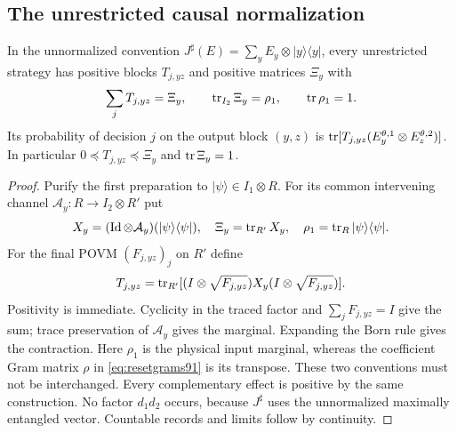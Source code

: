 \subsection{The unrestricted causal normalization}
\begin{proposition}\label{prop:causalnormal91}
In the unnormalized convention
$J^\sharp(E)=\sum_yE_y\otimes|y\rangle\langle y|$, every unrestricted
strategy has positive blocks $T_{j,yz}$ and positive matrices $\Xi_y$ with
\begin{equation}\label{eq:causalnormal91}
 \sum_jT_{j,yz}=\Xi_y,\qquad
 \operatorname{tr}_{I_2}\Xi_y=\rho_1,\qquad\operatorname{tr}\rho_1=1.
\end{equation}
Its probability of decision $j$ on the output block $(y,z)$ is
$\operatorname{tr}[T_{j,yz}(E_y^{\theta,1}\otimes E_z^{\theta,2})]$.
In particular $0\preceq T_{j,yz}\preceq\Xi_y$ and $\operatorname{tr}\Xi_y=1$.
\end{proposition}
\begin{proof}
Purify the first preparation to $|\psi\rangle\in I_1\otimes R$.
For its common intervening channel $\mathcal A_y:R\to I_2\otimes R'$
put
\[
 X_y=(\operatorname{Id}\otimes\mathcal A_y)(|\psi\rangle\langle\psi|),
 \quad\Xi_y=\operatorname{tr}_{R'}X_y,\quad\rho_1=\operatorname{tr}_R|\psi\rangle\langle\psi|.
\]
For the final POVM $(F_{j,yz})_j$ on $R'$ define
\[
 T_{j,yz}=\operatorname{tr}_{R'}[(I\otimes\sqrt{F_{j,yz}})X_y
                              (I\otimes\sqrt{F_{j,yz}})].
\]
Positivity is immediate.  Cyclicity in the traced factor and
$\sum_jF_{j,yz}=I$ give the sum; trace preservation of $\mathcal A_y$
gives the marginal.  Expanding the Born rule gives the contraction.
Here $\rho_1$ is the physical input marginal, whereas the coefficient
Gram matrix $\rho$ in \eqref{eq:resetgrams91} is its transpose.
These two conventions must not be interchanged.  Every complementary
effect is positive by the same construction.  No factor $d_1d_2$
occurs, because $J^\sharp$ uses the unnormalized maximally entangled
vector.  Countable records and limits follow by continuity.
\end{proof}
